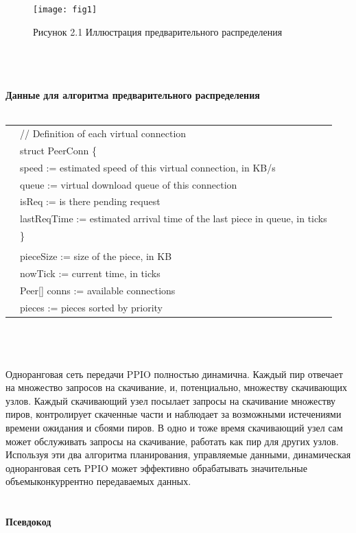 \documentclass[10pt,a4paper]{article}
\begin{document}
\begin{figure}[!htb]   %
    \centering
    \texttt{[image: fig1]}
    \label{circuit}
\centerline{{Рисунок 2.1 Иллюстрация предварительного распределения}}
    \vspace{-2.5em}
\end{figure}
\noindent   
\\
\vspace{-0.5em}
\\ \\ {\bf Данные для алгоритма предварительного распределения}
\vspace{-0.3em}
\\\\
\begin{tabular}{r|l}
\quad  & // Definition of each virtual connection  \\
\quad  & struct PeerConn \{   \\ 
 \quad &\qquad speed := estimated speed of this virtual connection, in KB/s  \\ 
 \quad &\qquad queue := virtual download queue of this connection     \\ 
 \quad &\qquad isReq := is there pending request    \\ 
 \quad &\qquad lastReqTime := estimated arrival time of the last piece in queue, in ticks   \\ 
 \quad &\}   \\ 
\\ 
\quad	&pieceSize := size of the piece, in KB  \\ 
\quad	&nowTick := current time, in ticks   \\ 
\quad	&Peer[] conns := available connections   \\
	&pieces := pieces sorted by priority   \\
\end{tabular}
\vspace{-0.5em}
\\\\\\
\noindent   
Одноранговая сеть передачи PPIO полностью динамична. Каждый пир отвечает на множество запросов на скачивание, и, потенциально, множеству скачивающих узлов. Каждый скачивающий узел посылает запросы на скачивание множеству пиров, контролирует скаченные части и наблюдает за возможными истечениями времени ожидания и сбоями пиров. В одно и тоже время скачивающий узел сам может обслуживать запросы на скачивание, работать как пир для других узлов. Используя эти два алгоритма планирования, управляемые данными, динамическая одноранговая сеть PPIO может эффективно обрабатывать значительные объемыконкуррентно передаваемых данных.
\vspace{-0.7em}
\noindent   
\\
\vspace{-0.5em}
\\ \\ {\bf Псевдокод}\\
\end{document}
